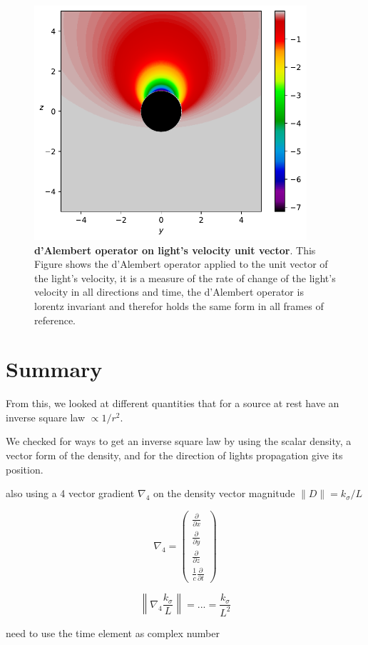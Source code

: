 \begin{figure}[H]
	\centering
	\includegraphics[width=0.9\textwidth]{images/pdf/d_alembert_operator_on_lights_velocity_unit_vector.pdf}
	\caption{\textbf{d'Alembert operator on light's velocity unit vector}. This Figure shows the d'Alembert operator applied to the unit vector of the light's velocity, it is a measure of the rate of change of the light's velocity in all directions and time, the d'Alembert operator is lorentz invariant and therefor holds the same form in all frames of reference.}
	\label{fig: d'Alembert operator on light's velocity unit vector}
\end{figure}

\section{Summary}\label{sect: Summary app 2}

From this, we looked at different quantities that for a source at rest have an inverse square law $\propto 1/r^2$.

We checked for ways to get an inverse square law by using the scalar density, a vector form of the density, and for the direction of lights propagation give its position.


also using a 4 vector gradient $\nabla_4$ on the density vector magnitude $\|D\| = k_\sigma / L$

\begin{equation}
	\nabla_4 = \begin{pmatrix}
		\frac{\partial}{\partial x} \\
		\frac{\partial}{\partial y} \\
		\frac{\partial}{\partial z} \\
		\frac{1}{c} \frac{\partial}{\partial t}
	\end{pmatrix}
\end{equation}

\begin{equation}
	\left \| \nabla_4 \frac{k_\sigma }{L} \right\| = ... = \frac{k_\sigma}{L^2}
\end{equation}

need to use the time element as complex number